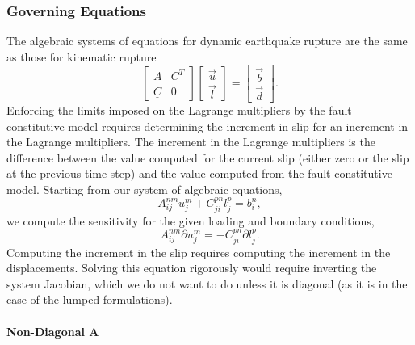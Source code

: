 \subsubsection{Governing Equations}

The algebraic systems of equations for dynamic earthquake rupture
are the same as those for kinematic rupture
\begin{equation}
\left[\begin{array}{cc}
\underline{A} & \underline{C}^{T}\\
\underline{C} & 0
\end{array}\right]\left[\begin{array}{c}
\overrightarrow{u}\\
\overrightarrow{l}
\end{array}\right]=\left[\begin{array}{c}
\overrightarrow{b}\\
\overrightarrow{d}
\end{array}\right].
\end{equation}
Enforcing the limits imposed on the Lagrange multipliers by the fault
constitutive model requires determining the increment in slip for
an increment in the Lagrange multipliers. The increment in the Lagrange
multipliers is the difference between the value computed for the current
slip (either zero or the slip at the previous time step) and the value
computed from the fault constitutive model. Starting from our system
of algebraic equations,
\begin{equation}
A_{ij}^{nm}u_{j}^{m}+C_{ji}^{pn}l_{j}^{p}=b_{i}^{n},
\end{equation}
we compute the sensitivity for the given loading and boundary conditions,
\begin{equation}
A_{ij}^{nm}\partial u_{j}^{m}=-C_{ji}^{pn}\partial l_{j}^{p}.
\end{equation}
Computing the increment in the slip requires computing the increment
in the displacements. Solving this equation rigorously would require
inverting the system Jacobian, which we do not want to do unless it
is diagonal (as it is in the case of the lumped formulations). 


\paragraph{Non-Diagonal A}

